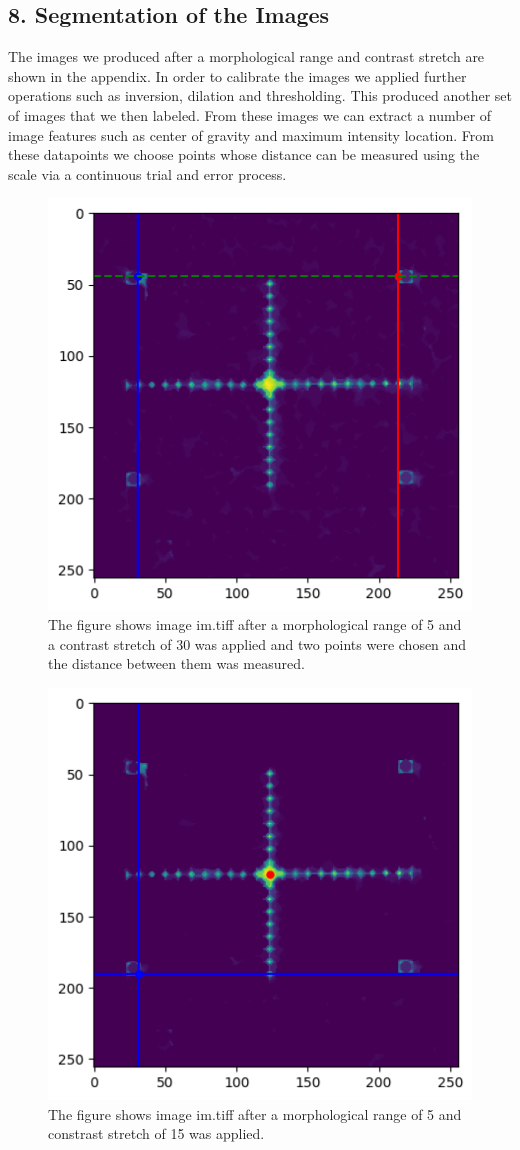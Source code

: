 \documentclass{article}
\begin{document}
\subsection*{8. Segmentation of the Images}
The images we produced after a morphological range and contrast stretch are shown in the appendix. In order to calibrate the images we applied further operations such as inversion, dilation and thresholding. This produced another set of images that we then labeled. From these images we can extract a number of image features such as center of gravity and maximum intensity location. From these datapoints we choose points whose distance can be measured using the scale via a continuous trial and error process. 
\begin{figure}[h!]
\centering
\includegraphics[width=0.4\linewidth]{Images/image_1_calculated.png}
\caption{\label{fig:background_correction}The figure shows image {im.tiff} after a morphological range of 5 and a contrast stretch of 30 was applied and two points were chosen and the distance between them was measured.}
\end{figure}

\begin{figure}[h!]
\centering
\includegraphics[width=0.4\linewidth]{Images/image2_calculated.png}
\caption{\label{fig:background_correction}The figure shows image {im.tiff} after a morphological range of 5 and constrast stretch of 15 was applied.}
\end{figure}
\end{document}
